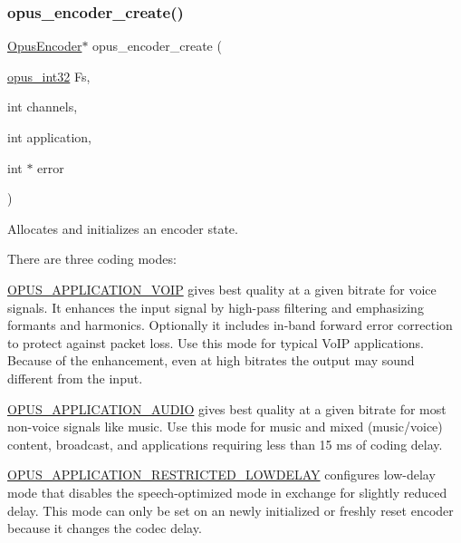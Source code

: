 \subsubsection{\texorpdfstring{opus\+\_\+encoder\+\_\+create()}{opus\_encoder\_create()}}
{\footnotesize\ttfamily \hyperlink{group__opus__encoder_gaf461a3ef2f10c2fe8b994a176f06c9bd}{Opus\+Encoder}$\ast$ opus\+\_\+encoder\+\_\+create (\begin{DoxyParamCaption}\item[{\hyperlink{opus__types_8h_aa4d309d6f80b99dbabebc8f98879ab9a}{opus\+\_\+int32}}]{Fs,  }\item[{int}]{channels,  }\item[{int}]{application,  }\item[{int $\ast$}]{error }\end{DoxyParamCaption})}



Allocates and initializes an encoder state. 

There are three coding modes\+:

\hyperlink{group__opus__ctlvalues_ga07884aa018303a419d1f7acb2f3fa669}{O\+P\+U\+S\+\_\+\+A\+P\+P\+L\+I\+C\+A\+T\+I\+O\+N\+\_\+\+V\+O\+IP} gives best quality at a given bitrate for voice signals. It enhances the input signal by high-\/pass filtering and emphasizing formants and harmonics. Optionally it includes in-\/band forward error correction to protect against packet loss. Use this mode for typical Vo\+IP applications. Because of the enhancement, even at high bitrates the output may sound different from the input.

\hyperlink{group__opus__ctlvalues_ga5909f7cb35c04f1110026c6889edd345}{O\+P\+U\+S\+\_\+\+A\+P\+P\+L\+I\+C\+A\+T\+I\+O\+N\+\_\+\+A\+U\+D\+IO} gives best quality at a given bitrate for most non-\/voice signals like music. Use this mode for music and mixed (music/voice) content, broadcast, and applications requiring less than 15 ms of coding delay.

\hyperlink{group__opus__ctlvalues_ga592232fb39db60c1369989c5c5d19a07}{O\+P\+U\+S\+\_\+\+A\+P\+P\+L\+I\+C\+A\+T\+I\+O\+N\+\_\+\+R\+E\+S\+T\+R\+I\+C\+T\+E\+D\+\_\+\+L\+O\+W\+D\+E\+L\+AY} configures low-\/delay mode that disables the speech-\/optimized mode in exchange for slightly reduced delay. This mode can only be set on an newly initialized or freshly reset encoder because it changes the codec delay.

